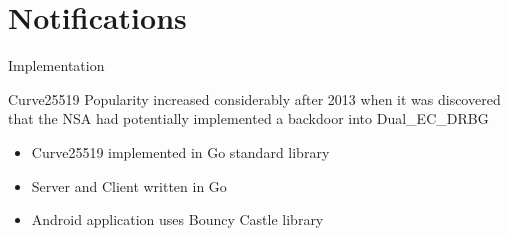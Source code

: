 \documentclass[aspectratio=169]{beamer}
\begin{document}
\section{Notifications}

  \begin{frame}{Implementation}
    \begin{figure}
      \centering
    \end{figure}
  \end{frame}

  \begin{frame}{Curve25519}
    Popularity increased considerably after 2013 when it was discovered that the NSA had potentially implemented a backdoor into Dual\_EC\_DRBG
    \begin{itemize}
      \item Curve25519 implemented in Go standard library
      \item Server and Client written in Go
      \item Android application uses Bouncy Castle library
    \end{itemize}
  \end{frame}
  
\end{document}
